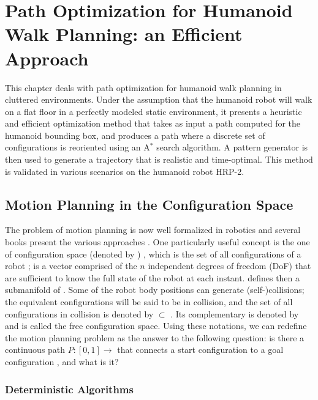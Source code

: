 \chapter{Path Optimization for Humanoid Walk Planning: an Efficient Approach}
\label{chap:path-optim}

This chapter deals with path optimization for humanoid walk planning
in cluttered environments. Under the assumption that the humanoid
robot will walk on a flat floor in a perfectly modeled static
environment, it presents a heuristic and efficient optimization method
that takes as input a path computed for the humanoid bounding box, and
produces a path where a discrete set of configurations is reoriented
using an A$^{*}$ search algorithm. A pattern generator is then used to
generate a trajectory that is realistic and time-optimal. This method
is validated in various scenarios on the humanoid robot HRP-2.

\section{Motion Planning in the Configuration Space}
\label{sec:chap1-motion-planning}

The problem of motion planning is now well formalized in robotics and
several books present the various approaches
\cite{lato91,chos05,lava06}. One particularly useful concept is the
one of configuration space (denoted by \cspace) \cite{loza83}, which
is the set of all configurations \config{} of a robot \robot;
\config{} is a vector comprised of the $n$ independent degrees of
freedom (DoF) that are sufficient to know the full state of the robot
at each instant. \cspace defines then a submanifold of \espace. Some
of the robot body positions can generate (self-)collisions; the
equivalent configurations will be said to be in collision, and the set
of all configurations in collision is denoted by \cobs
$\subset$ \cspace. Its complementary is denoted by \cfree and is
called the free configuration space. Using these notations, we can
redefine the motion planning problem as the answer to the following
question: is there a continuous path $P: [0,1] \rightarrow$ \cfree
that connects a start configuration  to a goal configuration
, and what is it?

\subsection{Deterministic Algorithms}
\label{subsec:chap1-deterministic algorithms}


